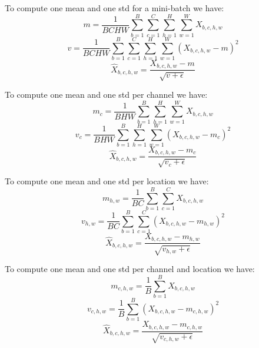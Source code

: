 \documentclass{article}
\begin{document}
{\color{blue}
To compute one mean and one std for a mini-batch we have:
\begin{equation}
    m = \frac{1}{BCHW} \sum_{b=1}^{B} \sum_{c=1}^{C} \sum_{h=1}^{H} \sum_{w=1}^{W}X_{b,c,h,w}
\end{equation}
\begin{equation}
    v= \frac{1}{BCHW} \sum_{b=1}^{B} \sum_{c=1}^{C} \sum_{h=1}^{H} \sum_{w=1}^{W}(X_{b,c,h,w}-m)^2
\end{equation}
\begin{equation}
    \hat{X}_{b,c,h,w}= \frac{X_{b,c,h,w}-m}{\sqrt{v+ \epsilon}}
\end{equation}

To compute one mean and one std per channel we have:
\begin{equation}
    m_c = \frac{1}{BHW} \sum_{b=1}^{B} \sum_{h=1}^{H} \sum_{w=1}^{W}X_{b,c,h,w}
\end{equation}
\begin{equation}
    v_c= \frac{1}{BHW} \sum_{b=1}^{B} \sum_{h=1}^{H} \sum_{w=1}^{W}(X_{b,c,h,w}-m_c)^2
\end{equation}
\begin{equation}
    \hat{X}_{b,c,h,w}= \frac{X_{b,c,h,w}-m_c}{\sqrt{v_c+ \epsilon}}
\end{equation}

To compute one mean and one std per location we have:
\begin{equation}
    m_{h,w} = \frac{1}{BC} \sum_{b=1}^{B} \sum_{c=1}^{C} X_{b,c,h,w}
\end{equation}
\begin{equation}
    v_{h,w}= \frac{1}{BC} \sum_{b=1}^{B} \sum_{c=1}^{C} (X_{b,c,h,w}-m_{h,w})^2
\end{equation}
\begin{equation}
    \hat{X}_{b,c,h,w}= \frac{X_{b,c,h,w}-m_{h,w}}{\sqrt{v_{h,w}+ \epsilon}}
\end{equation}

To compute one mean and one std per channel and location we have:
\begin{equation}
    m_{c,h,w} = \frac{1}{B} \sum_{b=1}^{B} X_{b,c,h,w}
\end{equation}
\begin{equation}
    v_{c,h,w}= \frac{1}{B} \sum_{b=1}^{B} (X_{b,c,h,w}-m_{c,h,w})^2
\end{equation}
\begin{equation}
    \hat{X}_{b,c,h,w}= \frac{X_{b,c,h,w}-m_{c,h,w}}{\sqrt{v_{c,h,w}+ \epsilon}}
\end{equation}

}
\end{document}
